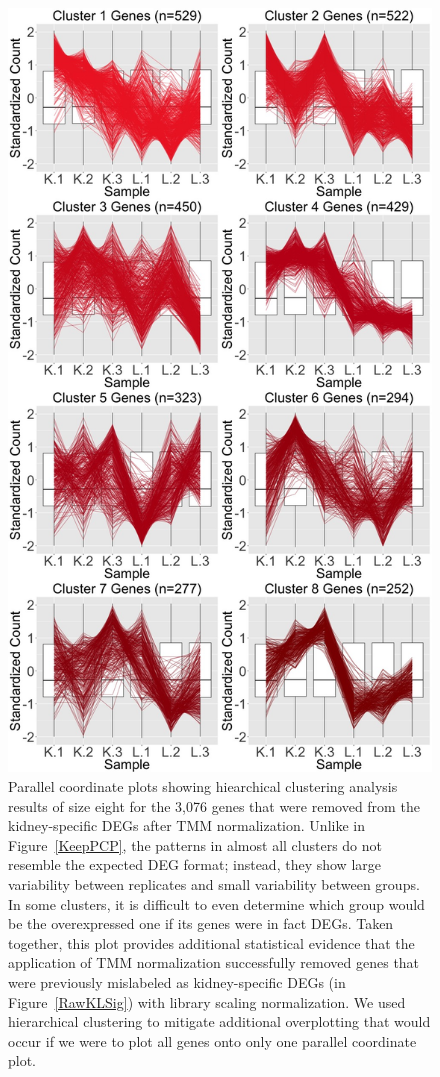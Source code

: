 \documentclass{article}
\begin{document}
\null
\begin{figure}[t!]
\centerline{\includegraphics[width=0.65\columnwidth]{../MakeFigures/lkClustersRemove.jpg}}
\caption{Parallel coordinate plots showing hiearchical clustering analysis results of size eight for the 3,076 genes that were removed from the kidney-specific DEGs after TMM normalization. Unlike in Figure~\ref{KeepPCP}, the patterns in almost all clusters do not resemble the expected DEG format; instead, they show large variability between replicates and small variability between groups. In some clusters, it is difficult to even determine which group would be the overexpressed one if its genes were in fact DEGs. Taken together, this plot provides additional statistical evidence that the application of TMM normalization successfully removed genes that were previously mislabeled as kidney-specific DEGs (in Figure~\ref{RawKLSig}) with library scaling normalization. We used hierarchical clustering to mitigate additional overplotting that would occur if we were to plot all genes onto only one parallel coordinate plot.
\label{lkClustersRemove}}
\end{figure}
\end{document}
